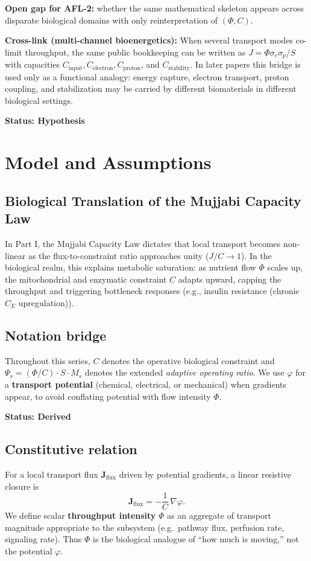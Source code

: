 \documentclass[11pt]{article}
\begin{document}
\textbf{Open gap for AFL-2:} whether the same mathematical skeleton appears across disparate biological domains with only reinterpretation of $(\Phi,C)$.

\textbf{Cross-link (multi-channel bioenergetics):} When several transport modes co-limit throughput, the same public bookkeeping can be written as $J=\Phi\sigma_e\sigma_p/S$ with capacities $C_{\mathrm{input}}, C_{\mathrm{electron}}, C_{\mathrm{proton}}$, and $C_{\mathrm{stability}}$. In later papers this bridge is used only as a functional analogy: energy capture, electron transport, proton coupling, and stabilization may be carried by different biomaterials in different biological settings.

\textbf{Status: Hypothesis}

\section{Model and Assumptions}

\subsection{Biological Translation of the Mujjabi Capacity Law \cite{MujjabiPartI2026}}
In Part I, the Mujjabi Capacity Law \cite{MujjabiPartI2026} dictates that local transport becomes non-linear as the flux-to-constraint ratio approaches unity ($J/C \to 1$). In the biological realm, this explains metabolic saturation: as nutrient flow $\Phi$ scales up, the mitochondrial and enzymatic constraint $C$ adapts upward, capping the throughput and triggering bottleneck responses (e.g., insulin resistance (chronic $C_E$ upregulation)).


\subsection{Notation bridge}
Throughout this series, $C$ denotes the operative biological constraint and
$\Psi_s=(\Phi/C) \cdot S \cdot M_s$ denotes the extended \emph{adaptive
operating ratio}. We use $\varphi$ for a \textbf{transport potential}
(chemical, electrical, or mechanical) when gradients appear, to avoid
conflating potential with flow intensity $\Phi$.

\textbf{Status: Derived}

\subsection{Constitutive relation}
For a local transport flux $\mathbf{J}_{\mathrm{flux}}$ driven by potential gradients, a linear resistive closure is
\begin{equation}
  \mathbf{J}_{\mathrm{flux}} = -\frac{1}{C}\,\nabla \varphi .
\end{equation}
We define scalar \textbf{throughput intensity} $\Phi$ as an aggregate of transport magnitude appropriate to the subsystem (e.g.\ pathway flux, perfusion rate, signaling rate). Thus $\Phi$ is the biological analogue of ``how much is moving,'' not the potential $\varphi$.
\end{document}
